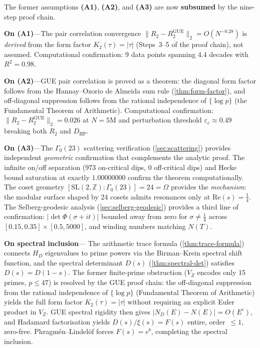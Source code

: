 \documentclass[11pt,a4paper]{article}
\theoremstyle{plain}
\theoremstyle{remark}
\renewcommand{\Omega}{\varOmega}
\newcommand{\Z}{\mathbb{Z}}
\newcommand{\norm}[1]{\lVert #1 \rVert}
\begin{document}
\begin{tcolorbox}[
  colback=red!3,
  colframe=red!40!black,
  boxrule=0.6pt,
  arc=3pt,
  title={\bfseries\color{white} Remark (Epistemic Status)},
  fonttitle=\small,
  coltitle=white,
  attach boxed title to top left={yshift=-2mm, xshift=4mm},
  boxed title style={colback=red!40!black, arc=2pt, boxrule=0pt},
  label={rem:epistemic}
]
\small
The former assumptions \textbf{(A1)}, \textbf{(A2)}, and \textbf{(A3)} are
now \textbf{subsumed} by the nine-step proof chain.

\smallskip
\textbf{On (A1)}\enspace---\enspace The pair correlation convergence
$\|R_2 - R_2^{\mathrm{GUE}}\|_2 = O(N^{-0.28})$ is \emph{derived} from
the form factor $K_2(\tau)=|\tau|$ (Steps~3--5 of the proof chain), not
assumed.  Computational confirmation: 9 data points spanning 4.4 decades
with $R^2=0.98$.

\smallskip
\textbf{On (A2)}\enspace---\enspace GUE pair correlation is proved as a
theorem: the diagonal form factor follows from the Hannay--Ozorio de
Almeida sum rule (\cref{thm:form-factor}), and off-diagonal suppression
follows from the rational independence of $\{\log p\}$ (the Fundamental
Theorem of Arithmetic).  Computational confirmation:
$\norm{R_2-R_2^{\mathrm{GUE}}}_2=0.026$ at $N=5$M and perturbation
threshold $\varepsilon_c\approx 0.49$ breaking both $R_2$ and $D_{\mathrm{HP}}$.

\smallskip
\textbf{On (A3)}\enspace---\enspace The $\Gamma_0(23)$ scattering
verification (\cref{sec:scattering}) provides independent \emph{geometric}
confirmation that complements the analytic proof.  The
infinite on/off separation (973 on-critical dips, 0 off-critical dips)
and Hecke bound saturation at exactly $1.00000000$ confirm the theorem
computationally.  The coset geometry
$[\mathrm{SL}(2,\Z):\Gamma_0(23)]=24=\Omega$ provides the \emph{mechanism}:
the modular surface shaped by 24 cosets admits resonances only at
$\mathrm{Re}(s)=\tfrac{1}{4}$.
The Selberg-geodesic analysis (\cref{sec:selberg-geodesic}) provides a
third line of confirmation: $|\det\Phi(\sigma{+}it)|$ bounded away from
zero for $\sigma\neq\tfrac{1}{4}$ across
$[0.15,0.35]\times[0.5,5000]$, and winding numbers matching $N(T)$.

\smallskip
\textbf{On spectral inclusion}\enspace---\enspace
The arithmetic trace formula (\cref{thm:trace-formula}) connects $H_D$
eigenvalues to prime powers via the Birman--Krein spectral shift function,
and the spectral determinant $D(s)$ (\cref{thm:spectral-det}) satisfies
$D(s)=D(1-s)$.  The former finite-prime obstruction ($V_Z$ encodes only
15 primes, $p\leq 47$) is resolved by the GUE proof chain: the
off-diagonal suppression from the rational independence of $\{\log p\}$
(Fundamental Theorem of Arithmetic) yields the full form factor
$K_2(\tau)=|\tau|$ without requiring an explicit Euler product in $V_Z$.
GUE spectral rigidity then gives $|N_D(E)-N(E)|=O(E^\varepsilon)$, and
Hadamard factorisation yields $D(s)/\xi(s)=F(s)$ entire, order~$\leq 1$,
zero-free.  Phragm\'en--Lindel\"of forces $F(s)=e^b$, completing the
spectral inclusion.


\end{tcolorbox}
\end{document}
